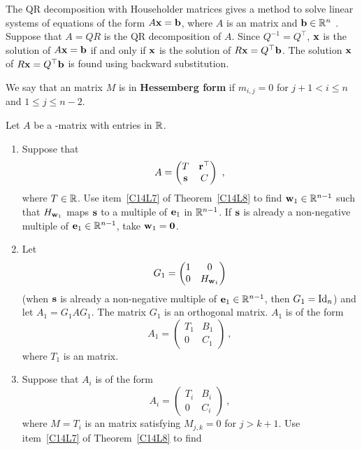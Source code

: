 The QR decomposition with Householder matrices gives a method to solve linear
systems of equations of the form $A\mathbf{x} = \mathbf{b}$, where $A$ is an 
 matrix and $\mathbf{b}\in \mathbb{R}^n$ .  Suppose that
$A=Q R$ is the QR decomposition of $A$.  Since $Q^{-1}=Q^\top$, $\mathbf{x}$
is the solution of $A\mathbf{x} = \mathbf{b}$ if and only if $\mathbf{x}$ is the
solution of $R\mathbf{x} = Q^\top \mathbf{b}$.  The solution $\mathbf{x}$ of
$R\mathbf{x} = Q^\top \mathbf{b}$ is found using backward substitution.

\begin{defn}
We say that an \nn matrix $M$ is in
{\bfseries Hessemberg form} if
$m_{i,j} = 0$ for $j + 1 < i \leq n$ and $1\leq j \leq n-2$.
\end{defn}

\begin{algo}
Let $A$ be a \nn-matrix with entries in $\mathbb{R}$.
\begin{enumerate}
\item  Suppose that
\[
A = \begin{pmatrix}
T & \mathbf{r}^\top \\
\mathbf{s} & C
\end{pmatrix} \ ,
\]
where $T \in \mathbb{R}$.  Use item~\ref{C14L7} of Theorem~\ref{C14L8} to
find $\mathbf{w}_1 \in \mathbb{R}^{n-1}$ such that $H_{\mathbf{w}_1}$ maps $\mathbf{s}$ to a
multiple of $\mathbf{e}_1$ in $\mathbb{R}^{n-1}$.  If $\mathbf{s}$ is already a
non-negative multiple of $\mathbf{e}_1 \in \mathbb{R}^{n-1}$, take
$\mathbf{w}_1=\mathbf{0}$.
\item  Let
\[
G_1 = \begin{pmatrix}
1 & 0 \\
0 & H_{\mathbf{w}_1}
\end{pmatrix}
\]
(when $\mathbf{s}$ is already a non-negative multiple of
$\mathbf{e}_1 \in \mathbb{R}^{n-1}$, then $G_1 = \operatorname{Id}_n$) and let $A_1 = G_1 A G_1$.
The matrix $G_1$ is an orthogonal matrix.  $A_1$ is of the form
\[
A_1 = \begin{pmatrix}
T_1 & B_1 \\
0 & C_1
\end{pmatrix} \ ,
\]
where $T_1$ is an  matrix.
\item Suppose that $A_i$ is of the form
\[
A_i =
\begin{pmatrix}
T_i & B_i \\
0 & C_i
\end{pmatrix} \ ,
\]
where $M=T_i$ is an  matrix satisfying $M_{j,k} = 0$
for $j > k+1$.  Use item~\ref{C14L7} of Theorem~\ref{C14L8} to find

\end{enumerate}
\end{algo}
